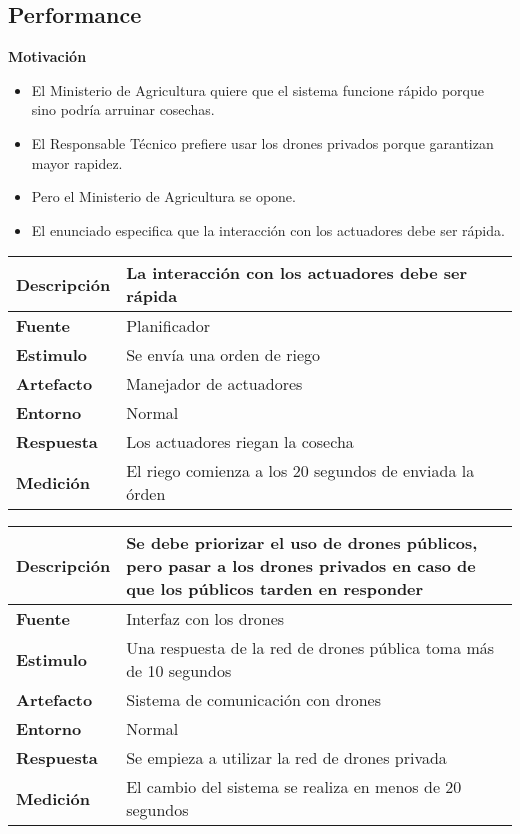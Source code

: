 \subsection{Performance}
\textbf{Motivación}
\begin{itemize}
 \item El Ministerio de Agricultura quiere que el sistema funcione rápido porque sino podría arruinar cosechas.
 \item El Responsable Técnico prefiere usar los drones privados porque garantizan mayor rapidez.
 \item Pero el Ministerio de Agricultura se opone.
 \item El enunciado especifica que la interacción con los actuadores debe ser rápida.
\end{itemize}

\begin{tabular}{| l || p{12cm} |}
\hline 
\textbf{Descripci\'on} & La interacción con los actuadores debe ser rápida \\
\hline 
\textbf{Fuente} & Planificador \\
\hline 
\textbf{Estimulo} & Se envía una orden de riego \\
\hline 
\textbf{Artefacto} & Manejador de actuadores \\
\hline 
\textbf{Entorno} & Normal \\
\hline 
\textbf{Respuesta} & Los actuadores riegan la cosecha \\
\hline 
\textbf{Medici\'on} & El riego comienza a los 20 segundos de enviada la órden \\
\hline 
\end{tabular}

\medskip

\begin{tabular}{| l || p{12cm} |}
\hline 
\textbf{Descripci\'on} & Se debe priorizar el uso de drones públicos, pero pasar a los drones privados en caso de que los públicos tarden en responder \\
\hline 
\textbf{Fuente} & Interfaz con los drones \\
\hline 
\textbf{Estimulo} & Una respuesta de la red de drones pública toma más de 10 segundos \\
\hline 
\textbf{Artefacto} & Sistema de comunicación con drones \\
\hline 
\textbf{Entorno} & Normal \\
\hline 
\textbf{Respuesta} & Se empieza a utilizar la red de drones privada \\
\hline 
\textbf{Medici\'on} & El cambio del sistema se realiza en menos de 20 segundos \\
\hline 
\end{tabular}


